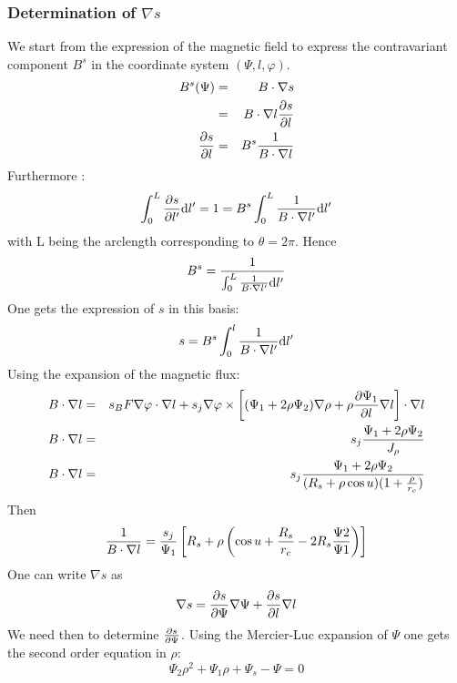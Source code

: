 \subsubsection{Determination of $\nabla s$}
We start from the expression of the magnetic field to express the contravariant component $B^s$ in the coordinate system $(\Psi,l,\varphi)$.
\begin{eqnarray}
B^s(\Psi) &=& B \cdot \nabla s \\
&=& B \cdot \nabla l \frac{\partial  s}{\partial l} \\
\frac{\partial  s}{\partial l} &=& B^s {1 \over B \cdot \nabla l}
\end{eqnarray}
Furthermore : 
\begin{equation}
\int_0^L {\frac{\partial  s}{\partial l'}\mathrm{d}l'} = 1 = B^s \int_0^L {{1 \over B \cdot \nabla l'}\mathrm{d}l'}
\end{equation}
with L being the arclength corresponding to $\theta = 2 \pi$.
Hence
\begin{equation}
B^s = {1 \over \int_0^L {{1 \over B \cdot \nabla l'}\mathrm{d}l'}}
\end{equation}
One gets the expression of $s$ in this basis:
\begin{equation}
s = B^s \int_0^l {{1 \over B \cdot \nabla l'}\mathrm{d}l'}
\end{equation}
Using the expansion of the magnetic flux:
\begin{eqnarray}
B \cdot \nabla l &=& s_B F\nabla \varphi \cdot \nabla l + s_j \nabla \varphi \times \left[(\Psi_1 + 2 \rho \Psi_2)\nabla \rho + \rho \frac{\partial  \Psi_1}{\partial l} \nabla l\right] \cdot \nabla l \\
B \cdot \nabla l &=& s_j {\Psi_1 + 2 \rho \Psi_2 \over J_\rho} \\
B \cdot \nabla l &=& s_j {\Psi_1 + 2 \rho \Psi_2 \over (R_s + \rho \cos u)(1 + {\rho \over r_c})}
\end{eqnarray}
Then 
\begin{equation}
{1 \over B \cdot \nabla l} = {s_j \over \Psi_1} \left[R_s + \rho \left(\cos u + {R_s \over r_c} - 2 R_s {\Psi2 \over \Psi1}\right)\right]
\end{equation}
One can write $\nabla s$ as
\begin{equation}
\nabla s = \frac{\partial  s}{\partial \Psi} \nabla \Psi + \frac{\partial  s}{\partial l} \nabla l
\end{equation}
We need then to determine $\frac{\partial  s}{\partial \Psi}$. Using the Mercier-Luc expansion of $\Psi$ one gets the second order equation in $\rho$:
\begin{equation}
\Psi_2 \rho^2 + \Psi_1 \rho + \Psi_s - \Psi = 0
\end{equation}
